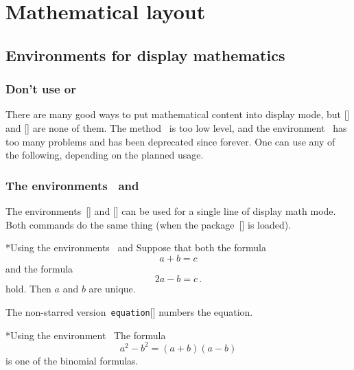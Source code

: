 \chapter{Mathematical layout}





\section{Environments for display mathematics}
\label{display environments}



\subsection{Don’t use \inlinecodetitle{\$\$  \$\$} or }

There are many good ways to put mathematical content into display mode, but \inlinecode{\$\$~\$\$}[\inlinecode] and [\envname] are none of them.
The method~\inlinecode{\$\$  \$\$} is too low level, and the environment~ has too many problems and has been deprecated since forever.
One can use any of the following, depending on the planned usage.



\subsection{The environments~\inlinecodetitle{{\tbs}[ {\tbs}]} and }

The environments~\inlinecode{{\tbs}[ {\tbs}]}[\inlinecode] and [\envname] can be used for a single line of display math mode.
Both commands do the same thing (when the package~[\packname] is loaded).
\begin{showlatex}*{Using the environments~\inlinecode{{\tbs}[ {\tbs}]} and }
Suppose that both the formula
\[
  a + b = c
\]
and the formula
\begin{equation*}
  2a - b = c \,.
\end{equation*}
hold.
Then $a$ and $b$ are unique.
\end{showlatex}
The non-starred version~\texttt{equation}[\envname] numbers the equation.
\begin{showlatex}*{Using the environment~}
The formula
\begin{equation}
  a^2 - b^2 = (a + b)(a - b)
\end{equation}
is one of the binomial formulas.
\end{showlatex}



